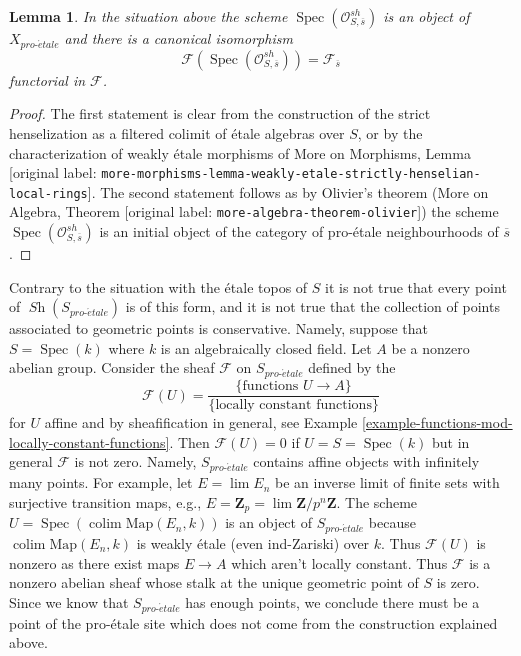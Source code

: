 \documentclass[10pt,a4paper]{article}
\theoremstyle{plain}
\newtheorem{lemma}[subsection]{Lemma}
\theoremstyle{definition}
\theoremstyle{remark}
\numberwithin{equation}{subsection}
\def\lim{\mathop{\mathrm{lim}}\nolimits}
\def\colim{\mathop{\mathrm{colim}}\nolimits}
\def\Spec{\mathop{\mathrm{Spec}}}
\def\Sh{\mathop{\mathit{Sh}}\nolimits}
\def\proetale{{pro\text{-}\acute{e}tale}}
\begin{document}
\begin{lemma}
\label{lemma-classical-point}
In the situation above the scheme $\Spec(\mathcal{O}_{S, \overline{s}}^{sh})$
is an object of $X_\proetale$ and there is a canonical isomorphism
$$
\mathcal{F}(\Spec(\mathcal{O}_{S, \overline{s}}^{sh})) =
\mathcal{F}_{\overline{s}}
$$
functorial in $\mathcal{F}$.
\end{lemma}

\begin{proof}
The first statement is clear from the construction of the strict henselization
as a filtered colimit of \'etale algebras over $S$, or by the characterization
of weakly \'etale morphisms of
More on Morphisms, Lemma
\textnormal{[original label: \nolinkurl{more-morphisms-lemma-weakly-etale-strictly-henselian-local-rings}]}.
The second statement follows as by Olivier's theorem
(More on Algebra, Theorem \textnormal{[original label: \nolinkurl{more-algebra-theorem-olivier}]})
the scheme $\Spec(\mathcal{O}_{S, \overline{s}}^{sh})$
is an initial object of the category of pro-\'etale neighbourhoods
of $\overline{s}$.
\end{proof}

\noindent
Contrary to the situation with the \'etale topos of $S$ it is not true
that every point of $\Sh(S_\proetale)$ is of this form, and it is not
true that the collection of points associated to geometric points is
conservative. Namely, suppose that $S = \Spec(k)$ where $k$ is an
algebraically closed field. Let $A$ be a nonzero abelian group.
Consider the sheaf $\mathcal{F}$ on $S_\proetale$ defined by the
$$
\mathcal{F}(U) =
\frac{\{\text{functions }U \to A\}}{\{\text{locally constant functions}\}}
$$
for $U$ affine and by sheafification in general, see
Example \ref{example-functions-mod-locally-constant-functions}.
Then $\mathcal{F}(U) = 0$ if $U = S = \Spec(k)$ but in general $\mathcal{F}$
is not zero. Namely, $S_\proetale$ contains affine objects
with infinitely many points. For example, let $E = \lim E_n$
be an inverse limit of finite sets with surjective transition maps,
e.g., $E = \mathbf{Z}_p = \lim \mathbf{Z}/p^n\mathbf{Z}$. The scheme
$U = \Spec(\colim \text{Map}(E_n, k))$ is an object of $S_\proetale$
because $\colim \text{Map}(E_n, k)$ is weakly \'etale (even ind-Zariski)
over $k$. Thus $\mathcal{F}(U)$ is nonzero as there exist maps $E \to A$
which aren't locally constant.
Thus $\mathcal{F}$ is a nonzero abelian sheaf whose stalk at the
unique geometric point of $S$ is zero. Since we know that $S_\proetale$
has enough points, we conclude there must be a point of the pro-\'etale
site which does not come from the construction explained above.
\end{document}
